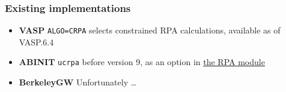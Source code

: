 \documentclass{beamer}
\newcommand{\xmark}{\ding{55}}%
\newcommand{\shortcode}[1]{\texttt{#1}}
\begin{document}
\begin{frame}
\frametitle{Existing implementations}

\begin{itemize}
    \item \textbf{VASP}    
    \shortcode{ALGO=CRPA} selects constrained RPA calculations, 
    available as of VASP.6.4
    \item \textbf{ABINIT} 
    \shortcode{ucrpa} before version 9, 
    as an option in \href{https://docs.abinit.org/variables/gw/\#ucrpa}{the RPA module}
    \item \textbf{BerkeleyGW} \xmark Unfortunately \dots
\end{itemize}

\end{frame}
\end{document}
